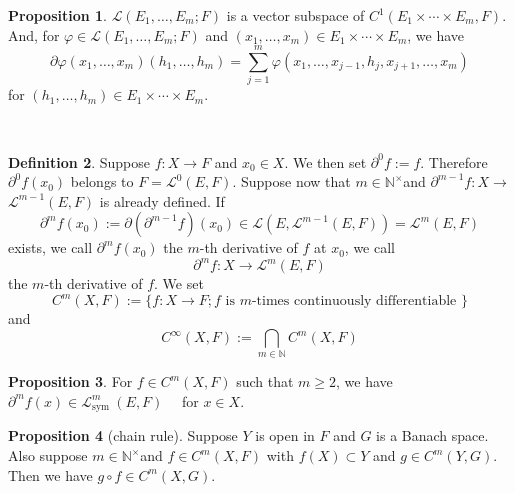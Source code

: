 \documentclass[12pt,a4paper]{book}
\newenvironment{prooff}{{\noindent\it\textcolor{cyan!40!black}{Proof}:}\,}{\par}
\theoremstyle{definition}
\newtheorem{defn}{Definition}[section]
\newtheorem{prop}[defn]{Proposition}
\begin{document}
\begin{prop}
$\mathcal{L}\left(E_1, \ldots, E_m ; F\right)$ is a vector subspace of $C^1\left(E_1 \times \cdots \times E_m, F\right)$. And, for $\varphi \in \mathcal{L}\left(E_1, \ldots, E_m ; F\right)$ and $\left(x_1, \ldots, x_m\right) \in E_1 \times \cdots \times E_m$, we have
$$
\partial \varphi\left(x_1, \ldots, x_m\right)\left(h_1, \ldots, h_m\right)=\sum_{j=1}^m \varphi\left(x_1, \ldots, x_{j-1}, h_j, x_{j+1}, \ldots, x_m\right)
$$
for $\left(h_1, \ldots, h_m\right) \in E_1 \times \cdots \times E_m$.
\label{proposition: mul-linear map is C1}
\end{prop} 
\begin{prooff}
 
\end{prooff}
\begin{defn}
    Suppose $f: X \rightarrow F$ and $x_0 \in X$. We then set $\partial^0 f:=f$. Therefore $\partial^0 f\left(x_0\right)$ belongs to $F=\mathcal{L}^0(E, F)$. Suppose now that $m \in \mathbb{N}^{\times}$and $\partial^{m-1} f: X \rightarrow$ $\mathcal{L}^{m-1}(E, F)$ is already defined. If
    $$
    \partial^m f\left(x_0\right):=\partial\left(\partial^{m-1} f\right)\left(x_0\right) \in \mathcal{L}\left(E, \mathcal{L}^{m-1}(E, F)\right)=\mathcal{L}^m(E, F)
    $$
    exists, we call $\partial^m f\left(x_0\right)$ the 
    $m$-th derivative of $f$ at $x_0$, we call
    $$
    \partial^m f: X \rightarrow \mathcal{L}^m(E, F)
    $$
    the $m$-th derivative of $f$.
    We set
    $$
    C^m(X, F):=\{f: X \rightarrow F ; f \text { is } m \text {-times continuously differentiable }\}
    $$
    and
    $$
    C^{\infty}(X, F):=\bigcap_{m \in \mathbb{N}} C^m(X, F)
    $$
\end{defn}
\begin{prop}
    For $f \in C^m(X, F)$ such that $m \geq 2$, we have $\partial^m f(x) \in \mathcal{L}_{\text {sym }}^m(E, F) \quad$ for $x \in X$.
\end{prop}
\begin{prop}[chain rule]
    Suppose $Y$ is open in $F$ and $G$ is a Banach space. Also suppose $m \in \mathbb{N}^{\times}$and $f \in C^m(X, F)$ with $f(X) \subset Y$ and $g \in C^m(Y, G)$. Then we have $g \circ f \in C^m(X, G)$.
\end{prop}
\end{document}
